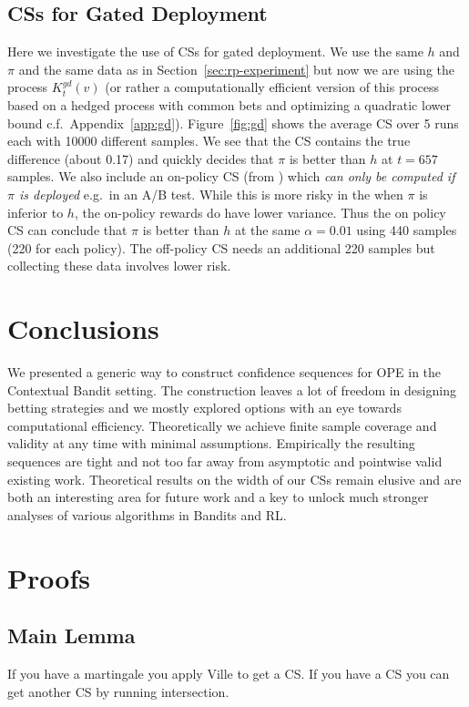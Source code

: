 \subsection{CSs for Gated Deployment}
Here we investigate the use of CSs for gated deployment. 
We use the same $h$ and $\pi$ and the same data as 
in Section~\ref{sec:rp-experiment} but now we are 
using the process $K_t^{gd}(v)$ 
(or rather a computationally efficient version 
of this process based on a hedged process with 
common bets and optimizing a quadratic lower bound
c.f.\ Appendix~\ref{app:gd}).
Figure~\ref{fig:gd} shows the average CS over 5 runs
each with 10000 different samples. We see that the 
CS contains the true difference (about 0.17) and quickly
decides that $\pi$ is better than $h$ at $t=657$ samples.
We also include an on-policy CS (from \cite{waudby-smith_variance-adaptive_2020}) which
\emph{can only be computed if $\pi$ is deployed} 
e.g.\ in an A/B test. While this is more risky in the 
when $\pi$ is inferior to $h$, the on-policy rewards 
do have lower variance. Thus the on policy CS can 
conclude that $\pi$ is better than $h$ at the 
same $\alpha=0.01$ using 440 samples 
(220 for each policy). The off-policy CS needs an 
additional 220 samples but collecting these data
involves lower risk.


\section{Conclusions}
We presented a generic way to construct confidence sequences 
for OPE in the Contextual Bandit setting. The construction leaves 
a lot of freedom in designing betting strategies and we mostly 
explored options with an eye towards computational
efficiency. Theoretically we achieve finite sample coverage 
and validity at any time with minimal assumptions. Empirically
the resulting sequences are tight and not too far away from asymptotic 
and pointwise valid existing work. Theoretical results on the 
width of our CSs remain elusive and are both an interesting 
area for future work and a key to unlock much stronger 
analyses of various algorithms in Bandits and RL.



\newpage
\onecolumn
\appendix
\section{Proofs}

\subsection{Main Lemma}
If you have a martingale you apply Ville to get a CS.
If you have a CS you can get another CS by running intersection.

